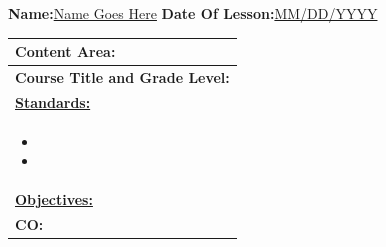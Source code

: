 \documentclass{article}
\begin{document}
\textbf{Name:}\underline{Name Goes Here} \hspace{90mm}\textbf{Date Of Lesson:}\underline{MM/DD/YYYY}

\begin{longtable}{ | m{50em} | } %
  \hline
  \textbf{Content Area:} \\ 
  \hline
  \textbf{Course Title and Grade Level:} \\ 
  \hline
  
  \underline{\textbf{Standards:}}\\ 
  \begin{center}
      \begin{itemize}
          \item 
          \item 
      \end{itemize}
  \end{center}\\
  \hline
  \underline{\textbf{Objectives:}}\\
  \textbf{CO:}
  \vspace{.1in}
  

\end{longtable}
\end{document}
